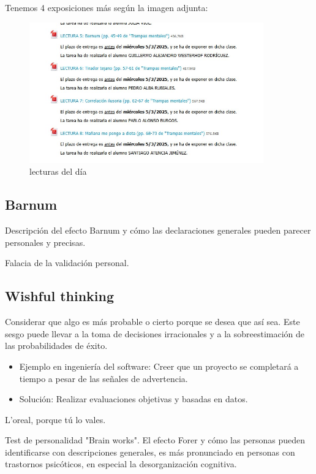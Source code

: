 \documentclass[12pt, a4paper, twoside]{article}
\begin{document}
Tenemos 4 exposiciones más según la imagen adjunta:
\begin{figure}[h]
    \centering
    \includegraphics[width=0.9\textwidth]{./Images/0305.jpg}
    \caption{lecturas del día}
\end{figure}

\subsection{Barnum}
Descripción del efecto Barnum y cómo las declaraciones generales pueden parecer personales y precisas.

Falacia de la validación personal.

\subsection{Wishful thinking}
Considerar que algo es más probable o cierto porque se desea que así sea. Este sesgo puede llevar a la toma de decisiones irracionales y a la sobreestimación de las probabilidades de éxito.

\begin{itemize}
    \item{Ejemplo en ingeniería del software: Creer que un proyecto se completará a tiempo a pesar de las señales de advertencia.}
    \item{Solución: Realizar evaluaciones objetivas y basadas en datos.}
\end{itemize}

L'oreal, porque tú lo vales.\newline

Test de personalidad "Brain works". El efecto Forer y cómo las personas pueden identificarse con descripciones generales, es más pronunciado en 
personas con trastornos psicóticos, en especial la desorganización cognitiva.
\end{document}
